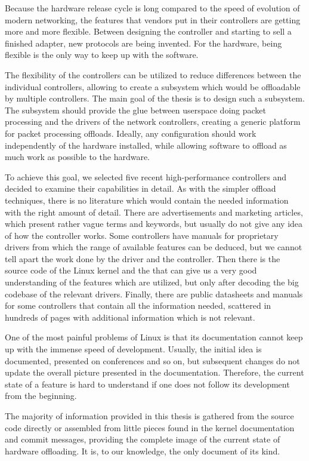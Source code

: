 Because the hardware release cycle is long compared to the speed of evolution
of modern networking, the features that vendors put in their controllers are
getting more and more flexible. Between designing the controller and starting
to sell a finished adapter, new protocols are being invented. For the hardware,
being flexible is the only way to keep up with the software.

The flexibility of the controllers can be utilized to reduce differences
between the individual controllers, allowing to create a subsystem which would be
offloadable by multiple controllers. The main goal of the thesis is to design
such a subsystem. The subsystem should provide the glue between userspace doing
packet processing and the drivers of the network controllers, creating a generic
platform for packet processing offloads. Ideally, any configuration should work
independently of the hardware installed, while allowing software to offload
as much work as possible to the hardware.

To achieve this goal, we selected five recent high-performance controllers and
decided to examine their capabilities in detail. As with the simpler offload
techniques, there is no literature which would contain the needed information
with the right amount of detail. There are advertisements and marketing
articles, which present rather vague terms and keywords, but usually do not
give any idea of how the controller works. Some controllers have manuals for
proprietary drivers from which the range of available features can be
deduced, but we cannot tell apart the work done by the driver and the
controller. Then there is the source code of the Linux kernel and the
 that can give us a very good understanding of the features which are
utilized, but only after decoding the big codebase of the relevant drivers.
Finally, there are public datasheets and manuals for some controllers that
contain all the information needed, scattered in hundreds of pages with
additional information which is not relevant.

One of the most painful problems of Linux is that its documentation cannot keep
up with the immense speed of development. Usually, the initial idea is
documented, presented on conferences and so on, but subsequent changes do not
update the overall picture presented in the documentation. Therefore, the
current state of a feature is hard to understand if one does not follow its
development from the beginning.

The majority of information provided in this thesis is gathered from the source
code directly or assembled from little pieces found in the kernel documentation
and commit messages, providing the complete image of the current state of
hardware offloading. It is, to our knowledge, the only document of its
kind.

